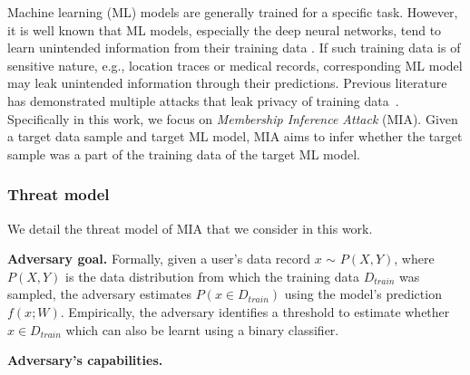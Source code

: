 Machine learning (ML) models are generally trained for a specific task.
However, it is well known that ML models, especially the deep neural networks, tend to learn unintended information from their training data \cite{}.
If such training data is of sensitive nature, e.g., location traces or medical records, corresponding ML model may leak unintended information through their predictions.
Previous literature has demonstrated multiple attacks that leak privacy of training data~\cite{}.
Specifically in this work, we focus on \emph{Membership Inference Attack} (MIA).
Given a target data sample and target ML model, MIA aims to infer whether the target sample was a part of the training data of the target ML model.



\subsubsection{Threat model}\label{mia_threat_model}
We detail the threat model of MIA that we consider in this work.


\noindent\textbf{Adversary goal.} 
Formally, given a user's data record $x$ $\sim$ $P(X,Y)$, where $P(X,Y)$ is the data distribution from which the training data $D_{train}$ was sampled, the adversary estimates $P(x \in D_{train})$ using the model's prediction $f(x;W)$.
Empirically, the adversary identifies a threshold to estimate whether $x \in D_{train}$ which can also be learnt using a binary classifier.

\noindent\textbf{Adversary's capabilities.}

